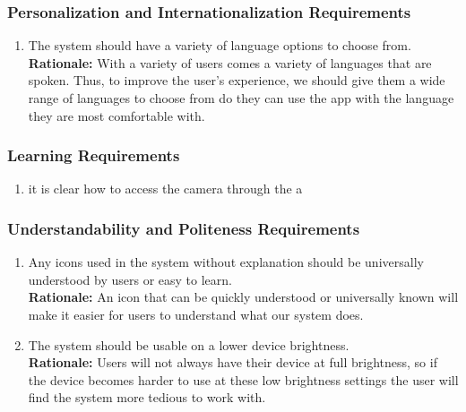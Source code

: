 \documentclass[]{article}
\begin{document}
\subsubsection{Personalization and Internationalization Requirements}
\label{ssub:personalization_and_internationalization_requirements}
\begin{enumerate}[{UH-PI}1. ]
	\item The system should have a variety of language options to choose from.\\
	\textbf{Rationale:} With a variety of users comes a variety of languages that are spoken. Thus, to improve the user's experience, we should give them a wide range of languages to choose from do they can use the app with the language they are most comfortable with.
\end{enumerate}

\subsubsection{Learning Requirements}
\label{ssub:learning_requirements}
\begin{enumerate}[{UH-L}1. ]
	\item it is clear how to access the camera through the a	
\end{enumerate}

\subsubsection{Understandability and Politeness Requirements}
\label{ssub:understandability_and_politeness_requirements}
\begin{enumerate}[{UH-UP}1. ]
	\item Any icons used in the system without explanation should be universally understood by users or easy to learn.\\
	\textbf{Rationale:} An icon that can be quickly understood or universally known will make it easier for users to understand what our system does.
	\item The system should be usable on a lower device brightness.\\
	\textbf{Rationale:} Users will not always have their device at full brightness, so if the device becomes harder to use at these low brightness settings the user will find the system more tedious to work with.
\end{enumerate}
\end{document}
